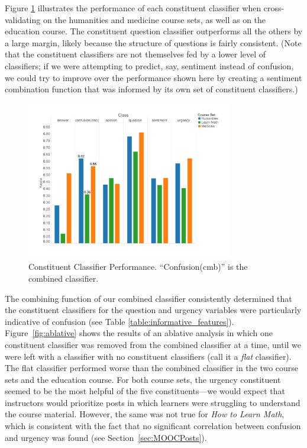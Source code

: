\documentclass{edm_template}
\begin{document}
Figure \ref{figure:constituents} illustrates the performance of each constituent classifier when cross-validating on the humanities and medicine course sets, as well as on the education course. The constituent question classifier outperforms all the others by a large margin, likely because the structure of questions is fairly consistent. (Note that the constituent classifiers are not themselves fed by a lower level of classifiers; if we were attempting to predict, say, sentiment instead of confusion, we could try to improve over the performance shown here by creating a sentiment combination function that was informed by its own set of constituent classifiers.)

\begin{figure}[]
       \centering
       \includegraphics[width=0.8\textwidth]{../Figs/classifierEvalsWithEdu.pdf}
       \caption{\textnormal{Constituent Classifier Performance. ``Confusion(cmb)'' is the combined classifier.}}
      \label{figure:constituents}
\end{figure}

The combining function of our combined classifier consistently determined that the constituent classifiers for the question and urgency variables were particularly indicative of confusion (see Table \ref{table:informative_features}). Figure~\ref{fig:ablative} shows the results of an ablative analysis in which one constituent classifier was removed from the combined classifier at a time, until we were left with a classifier with no constituent classifiers (call it a \emph{flat} classifier). The flat classifier performed worse than the combined classifier in the two course sets and the education course. For both course sets, the urgency constituent seemed to be the most helpful of the five constituents---we would expect that instructors would prioritize posts in which learners were struggling to understand the course material. However, the same was not true for \emph{How to Learn Math}, which is consistent with the fact that no significant correlation between confusion and urgency was found (see Section~\ref{sec:MOOCPosts}).
\end{document}
